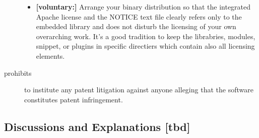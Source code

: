 \begin{description}
\begin{itemize}
 \item \textbf{[voluntary:]} Arrange your binary distribution so that the
  integrated Apache license and the NOTICE text file clearly refers only to the
  embedded library and does not disturb the licensing of your own overarching
  work. It's a good tradition to keep the librabries, modules, snippet, or
  plugins in specific directiers which contain also all licensing elements.
  
\end{itemize}

\item[prohibits] to institute any patent litigation against anyone alleging that
the software constitutes patent infringement.

\end{description}

\subsection{Discussions and Explanations [tbd]}







%
